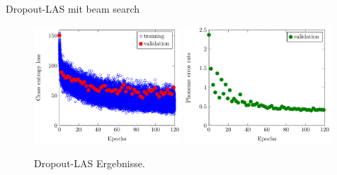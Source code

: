 \documentclass[10pt]{beamer}
\begin{document}
\begin{frame}{Dropout-LAS mit beam search}
	\begin{figure}
	\includegraphics[width=0.49\textwidth]{../tikz/LAS_dropout0805_in00_p06_e120_double_loss}
	\includegraphics[width=0.49\textwidth]{../tikz/LAS_dropout0805_in00_p06_e120_double_error}
	\caption{Dropout-LAS Ergebnisse.}
	\end{figure}
\end{frame}
\end{document}

